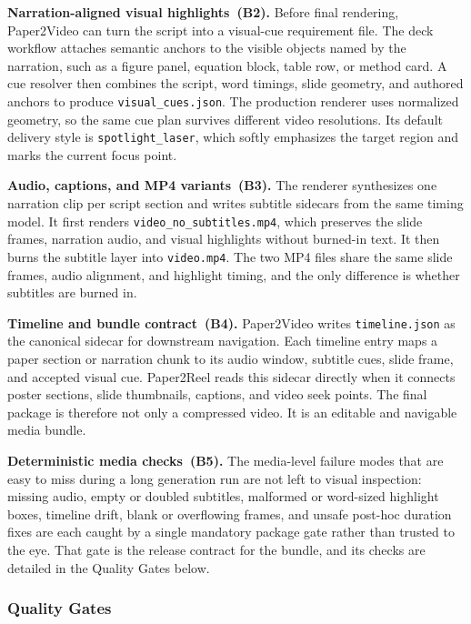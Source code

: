 \documentclass{article}
\begin{document}
\textbf{Narration-aligned visual highlights~(B2).} Before final rendering, Paper2Video can turn the script into a visual-cue requirement file. The deck workflow attaches semantic anchors to the visible objects named by the narration, such as a figure panel, equation block, table row, or method card. A cue resolver then combines the script, word timings, slide geometry, and authored anchors to produce \texttt{visual\_cues.json}. The production renderer uses normalized geometry, so the same cue plan survives different video resolutions. Its default delivery style is \texttt{spotlight\_laser}, which softly emphasizes the target region and marks the current focus point.

\textbf{Audio, captions, and MP4 variants~(B3).} The renderer synthesizes one narration clip per script section and writes subtitle sidecars from the same timing model. It first renders \texttt{video\_no\_subtitles.mp4}, which preserves the slide frames, narration audio, and visual highlights without burned-in text. It then burns the subtitle layer into \texttt{video.mp4}. The two MP4 files share the same slide frames, audio alignment, and highlight timing, and the only difference is whether subtitles are burned in.

\textbf{Timeline and bundle contract~(B4).} Paper2Video writes \texttt{timeline.json} as the canonical sidecar for downstream navigation. Each timeline entry maps a paper section or narration chunk to its audio window, subtitle cues, slide frame, and accepted visual cue. Paper2Reel reads this sidecar directly when it connects poster sections, slide thumbnails, captions, and video seek points. The final package is therefore not only a compressed video. It is an editable and navigable media bundle.

\textbf{Deterministic media checks~(B5).} The media-level failure modes that are easy to miss during a long generation run are not left to visual inspection: missing audio, empty or doubled subtitles, malformed or word-sized highlight boxes, timeline drift, blank or overflowing frames, and unsafe post-hoc duration fixes are each caught by a single mandatory package gate rather than trusted to the eye. That gate is the release contract for the bundle, and its checks are detailed in the Quality Gates below.

\subsubsection{Quality Gates}
\end{document}
